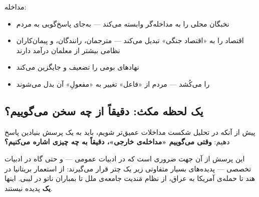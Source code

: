 \begin{tcolorbox}[enemybox, title={عامل ۴: وابستگی ساختاری}]
مداخله:
\begin{itemize}
\item نخبگان محلی را به مداخله‌گر وابسته می‌کند — به‌جای پاسخ‌گویی به مردم
\item اقتصاد را به «اقتصاد جنگی» تبدیل می‌کند — مترجمان، رانندگان، و
پیمان‌کاران نظامی بیشتر از معلمان درآمد دارند
\item نهادهای بومی را تضعیف و جایگزین می‌کند
\item {} را می‌کُشد — مردم از «فاعل» تغییر به
«مفعولِ» آن بدل می‌شوند
\end{itemize}
\end{tcolorbox}


\subsection{یک لحظه مکث: دقیقاً از چه سخن می‌گوییم؟}
\label{sec:ch15-taxonomy-intro}

پیش از آنکه در تحلیل شکست مداخلات عمیق‌تر شویم، باید به یک پرسش بنیادین
پاسخ دهیم: \textbf{وقتی می‌گوییم «مداخله‌ی خارجی»، دقیقاً به چه چیزی
اشاره می‌کنیم؟}

این پرسش از آن جهت ضروری است که در ادبیات عمومی — و حتی گاه در ادبیات
تخصصی — پدیده‌های بسیار متفاوتی زیر یک چتر قرار می‌گیرند: از استعمار
بریتانیا در هند تا حمله‌ی آمریکا به عراق، از نظام مَندیت جامعه‌ی ملل تا
بمباران ناتو در لیبی.  اینها \textbf{یک} پدیده نیستند.

